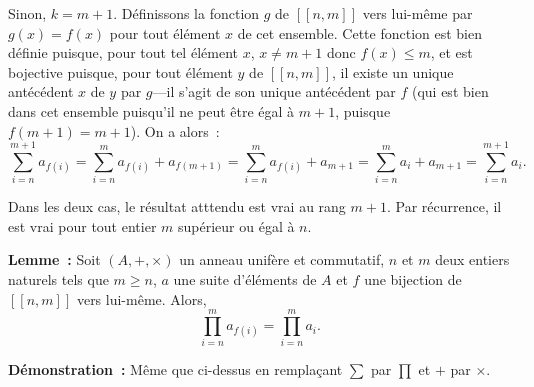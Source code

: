     Sinon, $k = m+1$. 
    Définissons la fonction $g$ de $[\![n, m]\!]$ vers lui-même par $g(x) = f(x)$ pour tout élément $x$ de cet ensemble. 
    Cette fonction est bien définie puisque, pour tout tel élément $x$, $x \neq m+1$ donc $f(x) \leq m$, et est bojective puisque, pour tout élément $y$ de $[\![n, m]\!]$, il existe un unique antécédent $x$ de $y$ par $g$—il s'agit de son unique antécédent par $f$ (qui est bien dans cet ensemble puisqu'il ne peut être égal à $m+1$, puisque $f(m+1) = m+1$). 
    On a alors : 
    \begin{equation*}
        \sum_{i=n}^{m+1} a_{f(i)}
        = \sum_{i=n}^m a_{f(i)} + a_{f(m+1)}
        = \sum_{i=n}^m a_{f(i)} + a_{m+1}
        = \sum_{i=n}^m a_{i} + a_{m+1}
        = \sum_{i=n}^{m+1} a_{i}.
    \end{equation*}

    Dans les deux cas, le résultat atttendu est vrai au rang $m+1$.
    Par récurrence, il est vrai pour tout entier $m$ supérieur ou égal à $n$.

    \done

\medskip

\noindent\textbf{Lemme :} Soit $(A, +, \times)$ un anneau unifère et commutatif, $n$ et $m$ deux entiers naturels tels que $m \geq n$, $a$ une suite d'éléments de $A$ et $f$ une bijection de $[\![n, m]\!]$ vers lui-même. 
    Alors,
    \begin{equation*}
        \prod_{i=n}^m a_{f(i)} = \prod_{i=n}^m a_i.
    \end{equation*}

\medskip

\noindent\textbf{Démonstration :} Même que ci-dessus en remplaçant $\sum$ par $\prod$ et $+$ par $\times$.

